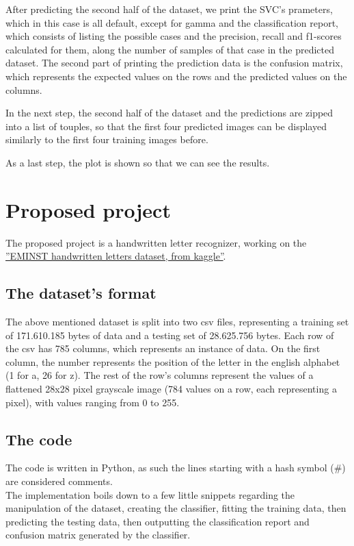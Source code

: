 \documentclass[a4paper,10pt]{report}
\begin{document}
 After predicting the second half of the dataset, we print the SVC's prameters, which in this case is all default, except for gamma and the classification report, which consists of listing the possible cases and the precision, recall and f1-scores calculated for them, along the number of samples of that case in the predicted dataset. The second part of printing the prediction data is the confusion matrix, which represents the expected values on the rows and the predicted values on the columns.
 
 In the next step, the second half of the dataset and the predictions are zipped into a list of touples, so that the first four predicted images can be displayed similarly to the first four training images before.
 
 As a last step, the plot is shown so that we can see the results.
 
 
\chapter{Proposed project}
 The proposed project is a handwritten letter recognizer, working on the \href{https://www.kaggle.com/ashishguptajiit/handwritten-az/}{''EMINST handwritten letters dataset, from kaggle''}.
 
 \section{The dataset's format}
 The above mentioned dataset is split into two csv files, representing a training set of 171.610.185 bytes of data and a testing set of 28.625.756 bytes.
 Each row of the csv has 785 columns, which represents an instance of data.
 On the first column, the number represents the position of the letter in the english alphabet (1 for a, 26 for z).
 The rest of the row's columns represent the values of a flattened 28x28 pixel grayscale image (784 values on a row, each representing a pixel), with values ranging from 0 to 255.
 
 \section{The code}
 The code is written in Python, as such the lines starting with a hash symbol (\#) are considered comments.\\
 The implementation boils down to a few little snippets regarding the manipulation of the dataset, creating the classifier, fitting the training data, then predicting the testing data, then outputting the classification report and confusion matrix generated by the classifier.
 
\end{document}
